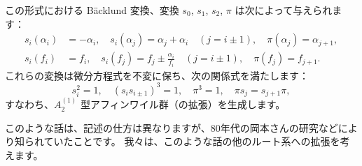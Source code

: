 \documentclass[uplatex,dvipdfmx]{jlreq}
\begin{document}
この形式における Bäcklund 変換、変換 $s_0$, $s_1$, $s_2$, $\pi$ は次によって与えられます：
\begin{align}
  s_i(\alpha_i) &= -\alpha_i, \quad
  s_i(\alpha_j) = \alpha_j + \alpha_i \quad (j = i \pm 1), \quad
  \pi(\alpha_j) = \alpha_{j+1}, \\
  s_i(f_i) &= f_i, \quad
  s_i(f_j) = f_j \pm \frac{\alpha_i}{f_i} \quad (j = i \pm 1), \quad
  \pi(f_j) = f_{j+1}.
\end{align}
これらの変換は微分方程式を不変に保ち、次の関係式を満たします：
\begin{equation}
  s_i^2 = 1, \quad
  (s_i s_{i \pm 1})^3 = 1, \quad
  \pi^3 = 1, \quad
  \pi s_j = s_{j+1} \pi,
\end{equation}
すなわち、$A^{(1)}_2$ 型アフィンワイル群（の拡張）を生成します。

このような話は、記述の仕方は異なりますが、80年代の岡本さんの研究などにより知られていたことです。
我々は、このような話の他のルート系への拡張を考えます。
\end{document}
